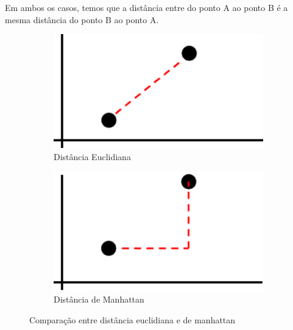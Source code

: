 Em ambos os casos, temos que a distância entre do ponto A ao ponto B é a mesma distância do ponto B ao ponto A.

\begin{figure}[h]
  \centering
  \begin{subfigure}{.5\textwidth}
    \centering
    \includegraphics[scale=0.5]{figuras/euclidean.eps}
    \caption{Distância Euclidiana}
  \end{subfigure}%
  \begin{subfigure}{.5\textwidth}
    \centering
    \includegraphics[scale=0.5]{figuras/manhattan.eps}
    \caption{Distância de Manhattan}
  \end{subfigure}
  \caption{Comparação entre distância euclidiana e de manhattan}
\end{figure}
